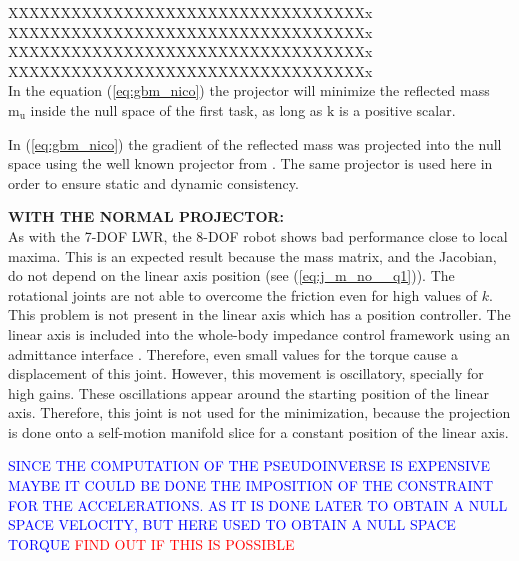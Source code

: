 XXXXXXXXXXXXXXXXXXXXXXXXXXXXXXXXXXx \\
XXXXXXXXXXXXXXXXXXXXXXXXXXXXXXXXXXx \\
XXXXXXXXXXXXXXXXXXXXXXXXXXXXXXXXXXx \\
XXXXXXXXXXXXXXXXXXXXXXXXXXXXXXXXXXx \\


In the equation (\ref{eq:gbm_nico}) the  projector will minimize the reflected mass $\mathrm{m_u}$ inside the null space of the first task, as long as $\mathrm{k}$ is a positive scalar. 

In (\ref{eq:gbm_nico}) the gradient of the reflected mass was projected into the null space using the well known projector from \cite{khatib1995}. The same projector is used here in order to ensure static and dynamic consistency.  



%
\textbf{WITH THE NORMAL PROJECTOR:}\\
 As with the 7-DOF LWR, the 8-DOF robot shows bad performance close to local maxima. This is an expected result because the mass matrix, and the Jacobian, do not depend on the linear axis position (see (\ref{eq:j_m_no__q1})). The rotational joints are not able to overcome the friction even for high values of $k$. This problem is not present in the linear axis which has a position controller. The linear axis is included into the whole-body impedance control framework using an admittance interface \cite{whole_body_imp}. Therefore, even small values for the torque cause a displacement of this joint.
  However, this movement is oscillatory, specially for high gains. These oscillations appear around the starting position of the linear axis. Therefore, this joint is not used for the minimization, because the projection is done onto a self-motion manifold slice for a constant position of the linear axis.
% 

\textcolor{blue}{ SINCE THE COMPUTATION OF THE PSEUDOINVERSE IS EXPENSIVE MAYBE IT COULD BE DONE THE IMPOSITION OF THE CONSTRAINT FOR THE ACCELERATIONS. AS IT IS DONE LATER TO OBTAIN A NULL SPACE VELOCITY, BUT HERE USED TO OBTAIN A NULL SPACE TORQUE} \textcolor{red}{FIND OUT IF THIS IS POSSIBLE
}



